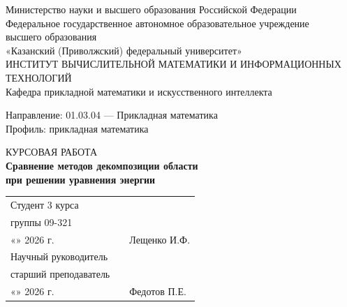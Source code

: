 \documentclass[14pt, a4paper]{extarticle}
\begin{document}
\begin{titlepage}
	\begin{center}
		Министерство науки и высшего образования Российской Федерации\\[0.5ex]
		Федеральное государственное автономное образовательное учреждение\\
		высшего образования\\[0.5ex]
		«Казанский (Приволжский) федеральный университет»\\[1ex]
		ИНСТИТУТ ВЫЧИСЛИТЕЛЬНОЙ МАТЕМАТИКИ И ИНФОРМАЦИОННЫХ ТЕХНОЛОГИЙ\\[0.5ex]
		Кафедра прикладной математики и искусственного интеллекта
	\end{center}

	\vfill

	\begin{center}
		Направление: 01.03.04 --- Прикладная математика\\[1ex]
		Профиль: прикладная математика
	\end{center}

	\vfill

	\begin{center}
		КУРСОВАЯ РАБОТА\\[1.5ex]
		\textbf{Сравнение методов декомпозиции области\\
			при решении уравнения энергии}
	\end{center}

	\vfill

	\noindent
	\begin{tabular}{@{}p{} >{\centering\arraybackslash}p{} l@{}}
		Студент 3 курса                                             &                            &              \\
		группы 09-321                                               &                            &              \\
		«\underline{\hspace{1cm}}» \underline{\hspace{2cm}} 2026 г. & \underline{\hspace{3.5cm}} & Лещенко И.Ф. \\[0.4cm]

		Научный руководитель                                        &                            &              \\
		старший преподаватель                                       &                            &              \\
		«\underline{\hspace{1cm}}» \underline{\hspace{2cm}} 2026 г. & \underline{\hspace{3.5cm}} & Федотов П.Е. \\[0.4cm]


\end{tabular}
\end{titlepage}
\end{document}
